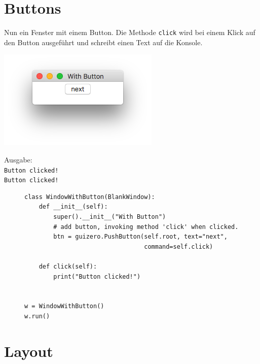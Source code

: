 \documentclass{tufte-handout}
\begin{document}
\section{Buttons}

Nun ein Fenster mit einem Button. Die Methode \lstinline|click| wird bei einem
Klick auf den Button ausgeführt und schreibt einen Text auf die Konsole.

\begin{marginfigure}[3cm]
	\begin{center}
	\includegraphics[width=\textwidth]{../with_button.png}
	\end{center}
	
	Ausgabe:
	\texttt{\\
Button clicked!\\ 
Button clicked!
}

	
\end{marginfigure}

\begin{figure}
	\begin{lstlisting}
class WindowWithButton(BlankWindow):
    def __init__(self):
        super().__init__("With Button")
        # add button, invoking method 'click' when clicked.
        btn = guizero.PushButton(self.root, text="next", 
                                 command=self.click)

    def click(self):
        print("Button clicked!")


w = WindowWithButton()
w.run()   	\end{lstlisting}
\end{figure} 


\section{Layout}
\end{document}
